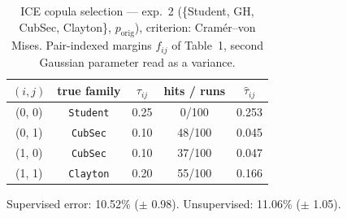 \begin{table}[htbp]
  \centering
  \caption{ICE copula selection — exp.\ 2 (\{Student, GH, CubSec, Clayton\}, $p_{\text{orig}}$), criterion: Cram\'er--von Mises. Pair-indexed margins $f_{ij}$ of Table~1, second Gaussian parameter read as a variance.}
  \label{tab:exp3-exp2_orig_p__cvm}
  \begin{tabular}{ccccc}
    \toprule
    $(i, j)$ & true family & $\tau_{ij}$ & hits / runs & $\hat\tau_{ij}$ \\
    \midrule
    (0, 0) & \texttt{Student} & 0.25 & 0/100 & 0.253 \\
    (0, 1) & \texttt{CubSec} & 0.10 & 48/100 & 0.045 \\
    (1, 0) & \texttt{CubSec} & 0.10 & 37/100 & 0.047 \\
    (1, 1) & \texttt{Clayton} & 0.20 & 55/100 & 0.166 \\
    \bottomrule
  \end{tabular}
  \par\smallskip Supervised error: 10.52\% ($\pm$ 0.98). Unsupervised: 11.06\% ($\pm$ 1.05).
\end{table}
